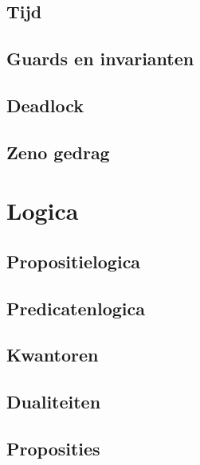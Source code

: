 \documentclass{article}
\begin{document}
	\subsection{Tijd}
	
	\subsection{Guards en invarianten}
	
	\subsection{Deadlock}
	
	\subsection{Zeno gedrag}
	
	\section{Logica}
	
	\subsection{Propositielogica}
	
	\subsection{Predicatenlogica}
	
	\subsection{Kwantoren}
	
	\subsection{Dualiteiten}
	
	\subsection{Proposities}
	
\end{document}

